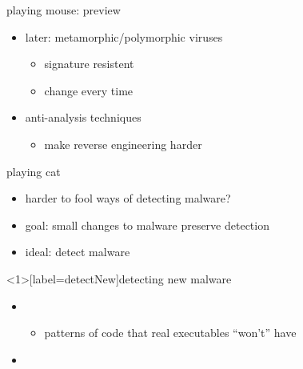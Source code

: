\begin{frame}{playing mouse: preview}
    \begin{itemize}
    \item later: metamorphic/polymorphic viruses
        \begin{itemize}
        \item signature resistent
        \item change every time
        \end{itemize}
    \item anti-analysis techniques
        \begin{itemize}
        \item make reverse engineering harder
        \end{itemize}
    \end{itemize}
\end{frame}

\begin{frame}{playing cat}
    \begin{itemize}
    \item harder to fool ways of detecting malware?
    \item goal: small changes to malware preserve detection
    \item ideal: detect  malware
    \end{itemize}
\end{frame}

\begin{frame}<1>[label=detectNew]{detecting new malware}
    \begin{itemize}
    \item {}
        \begin{itemize}
        \item patterns of code that real executables ``won't'' have
        \end{itemize}
    \item {}
    \end{itemize}
\end{frame}

